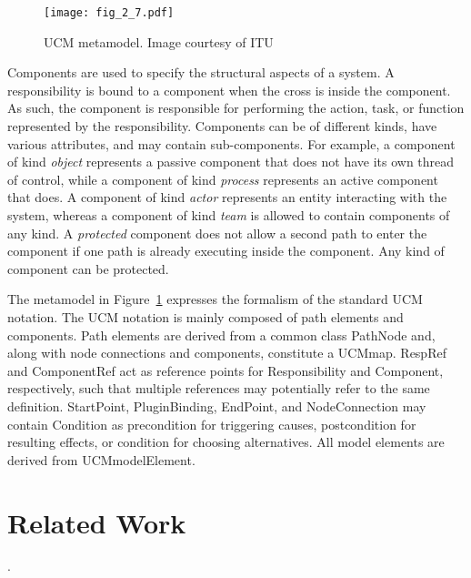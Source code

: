 \begin{figure}
	\centering
	\texttt{[image: fig\_2\_7.pdf]}
	\caption[UCM metamodel]{UCM metamodel. Image courtesy of ITU~\cite{itu2012151}}
	\label{fig:2.7}
\end{figure}

Components are used to specify the structural aspects of a system. A responsibility is bound to a component when the cross is inside the component. As such, the component is responsible for performing the action, task, or function represented by the responsibility. Components can be of different kinds, have various attributes, and may contain sub-components. For example, a component of kind \emph{object} represents a passive component that does not have its own thread of control, while a component of kind \emph{process} represents an active component that does. A component of kind \emph{actor} represents an entity interacting with the system, whereas a component of kind \emph{team} is allowed to contain components of any kind. A \emph{protected} component does not allow a second path to enter the component if one path is already executing inside the component. Any kind of component can be protected.

The metamodel in Figure~\ref{fig:2.7} expresses the formalism of the standard UCM notation. The UCM notation is mainly composed of path elements and components. Path elements are derived from a common class {\cls PathNode} and, along with node connections and components, constitute a {\cls UCMmap}. {\cls RespRef} and {\cls ComponentRef} act as reference points for {\cls Responsibility} and {\cls Component}, respectively, such that multiple references may potentially refer to the same definition. {\cls StartPoint}, {\cls PluginBinding}, {\cls EndPoint}, and {\cls NodeConnection} may contain {\cls Condition} as precondition for triggering causes, postcondition for resulting effects, or condition for choosing alternatives. All model elements are derived from {\cls UCMmodelElement}.

\section{Related Work} \label{sec:2.3}


.

